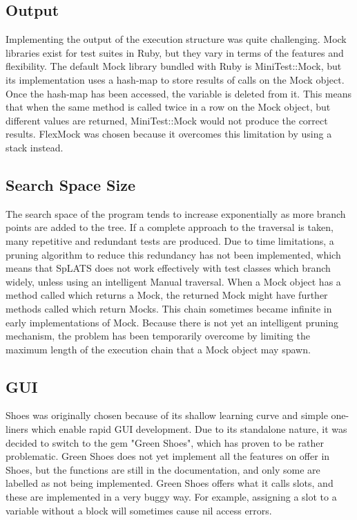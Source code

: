   \subsection{Output}
    Implementing the output of the execution structure was quite challenging. Mock libraries exist for test suites in Ruby, but they vary in terms of the features and flexibility. The default Mock library bundled with Ruby is MiniTest::Mock, but its implementation uses a hash-map to store results of calls on the Mock object. Once the hash-map has been accessed, the variable is deleted from it. This means that when the same method is called twice in a row on the Mock object, but different values are returned, MiniTest::Mock would not produce the correct results. FlexMock was chosen because it overcomes this limitation by using a stack instead.

  \subsection{Search Space Size}
    The search space of the program tends to increase exponentially as more branch points are added to the tree. If a complete approach to the traversal is taken, many repetitive and redundant tests are produced. Due to time limitations, a pruning algorithm to reduce this redundancy has not been implemented, which means that SpLATS does not work effectively with test classes which branch widely, unless using an intelligent Manual traversal.
    When a Mock object has a method called which returns a Mock, the returned Mock might have further methods called which return Mocks. This chain sometimes became infinite in early implementations of Mock. Because there is not yet an intelligent pruning mechanism, the problem has been temporarily overcome by limiting the maximum length of the execution chain that a Mock object may spawn.

  \subsection{GUI}
    Shoes was originally chosen because of its shallow learning curve and simple one-liners which enable rapid GUI development. Due to its standalone nature, it was decided to switch to the gem "Green Shoes", which has proven to be rather problematic. Green Shoes does not yet implement all the features on offer in Shoes, but the functions are still in the documentation, and only some are labelled as not being implemented. Green Shoes offers what it calls slots, and these are implemented in a very buggy way. For example, assigning a slot to a variable without a block will sometimes cause nil access errors.
    

